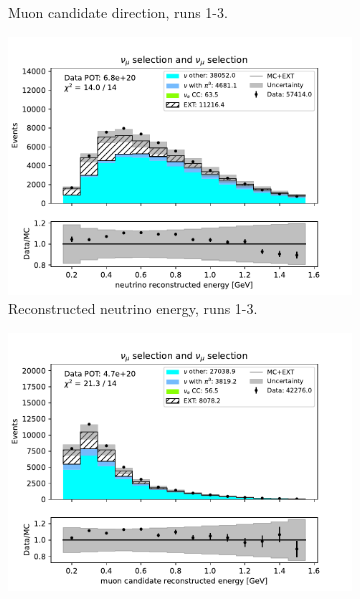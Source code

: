 \begin{figure}[H]
\begin{subfigure}{0.33\linewidth}
        \caption{Muon candidate direction, runs 1-3.}
    \end{subfigure}%
    \begin{subfigure}{0.33\linewidth}
        \captionsetup{width=0.7\linewidth}
        \includegraphics[width=\linewidth]{technote/Sidebands/Figures/NuMuSideband/muon_sideband_neutrino_energy_run123_NUMU_NUMU.pdf}
        \caption{Reconstructed neutrino energy, runs 1-3.}
    \end{subfigure}
    \begin{subfigure}{0.33\linewidth}
        \captionsetup{width=0.7\linewidth}
        \includegraphics[width=\linewidth]{technote/Sidebands/Figures/NuMuSideband/muon_sideband_muon_energy_run4a4b4c4d5_NUMU_NUMU.pdf}

\end{subfigure}
\end{figure}
